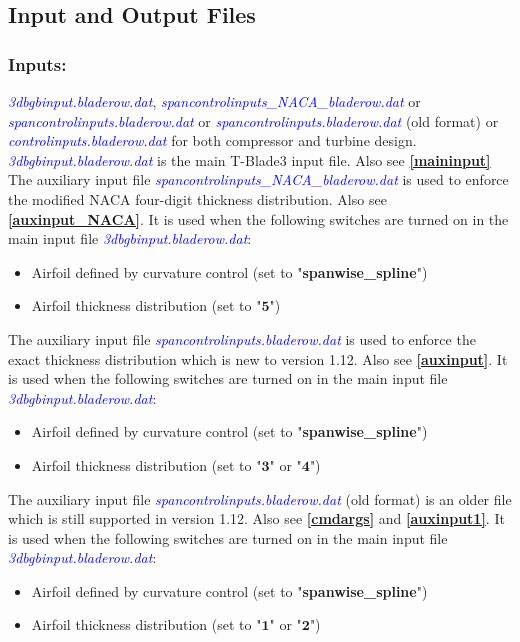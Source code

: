 \documentclass[8pt]{article}
\begin{document}
\subsection{Input and Output Files}\label{inputoutput}
\subsubsection{Inputs:}\label{inputs}
\noindent
\textit{\textcolor{blue}{3dbgbinput.bladerow.dat}}, \textit{\textcolor{blue}{spancontrolinputs\_NACA\_bladerow.dat}} or \textit{\textcolor{blue}{spancontrolinputs.bladerow.dat}} or \textit{\textcolor{blue}{spancontrolinputs.bladerow.dat}} (old format) or \textit{\textcolor{blue}{controlinputs.bladerow.dat}} for both compressor and turbine design.\\

\noindent
\textit{\textcolor{blue}{3dbgbinput.bladerow.dat}} is the main T-Blade3 input file. Also see \textbf{\ref{maininput}}\\ 

\noindent
The auxiliary input file \textit{\textcolor{blue}{spancontrolinputs\_NACA\_bladerow.dat}} is used to enforce the modified NACA four-digit thickness distribution. Also see \textbf{\ref{auxinput_NACA}}. It is used when the following switches are turned on in the main input file \textit{\textcolor{blue}{3dbgbinput.bladerow.dat}}:
\begin{itemize}
    \item Airfoil defined by curvature control (set to "\textbf{spanwise\_spline}")
    \item Airfoil thickness distribution (set to "$\mathbf{5}$")
\end{itemize}

\noindent
The auxiliary input file \textit{\textcolor{blue}{spancontrolinputs.bladerow.dat}} is used to enforce the exact thickness distribution which is new to version 1.12. Also see \textbf{\ref{auxinput}}. It is used when the following switches are turned on in the main input file \textit{\textcolor{blue}{3dbgbinput.bladerow.dat}}:
\begin{itemize}
    \item Airfoil defined by curvature control (set to "\textbf{spanwise\_spline}")
    \item Airfoil thickness distribution (set to "$\mathbf{3}$" or "$\mathbf{4}$")
\end{itemize}

\noindent
The auxiliary input file \textit{\textcolor{blue}{spancontrolinputs.bladerow.dat}} (old format) is an older file which is still supported in version 1.12. Also see \textbf{\ref{cmdargs}} and \textbf{\ref{auxinput1}}. It is used when the following switches are turned on in the main input file \textit{\textcolor{blue}{3dbgbinput.bladerow.dat}}:
\begin{itemize}
    \item Airfoil defined by curvature control (set to "\textbf{spanwise\_spline}")
    \item Airfoil thickness distribution (set to "$\mathbf{1}$" or "$\mathbf{2}$")
\end{itemize}
\end{document}
